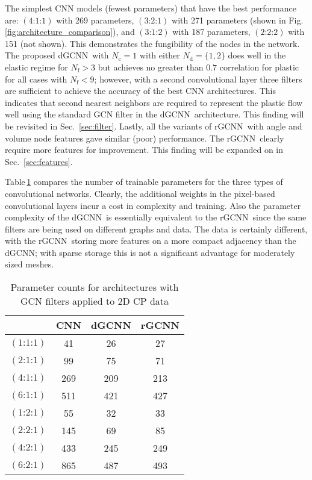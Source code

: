 \documentclass[12pt,reqno]{article}
\newcommand{\fref}[1]{Fig.\,\ref{#1}}
\newcommand{\tref}[1]{Table\,\ref{#1}}
\newcommand{\sref}[1]{Sec.\!~\ref{#1}}
\newcommand{\DGCNN}{{dGCNN}}
\newcommand{\RGCNN}{{rGCNN}}
\newcommand{\arch}[3]{({#1}\text{:}{#2}\text{:}{#3})}
\newcommand{\Nf}{N_\text{f}}
\newcommand{\Nc}{N_\text{c}}
\newcommand{\Nd}{N_\text{d}}
\begin{document}
The simplest CNN models (fewest parameters) that have the best performance are: $\arch{4}{1}{1}$ with 269 parameters, $\arch{3}{2}{1}$ with 271 parameters  (shown in \fref{fig:architecture_comparison}), and $\arch{3}{1}{2}$ with 187 parameters, $\arch{2}{2}{2}$ with 151  (not shown).
This demonstrates the fungibility of the nodes in the network.
The proposed \DGCNN~with $\Nc=1$ with either $\Nd=\{1,2\}$ does well in the elastic regime for $\Nf > 3$ but achieves no greater than $0.7$ correlation for plastic for all cases with $\Nf < 9$; however, with a second convolutional layer three filters are sufficient to achieve the accuracy of the best CNN architectures.
This indicates that second nearest neighbors are required to represent the plastic flow well using the standard GCN filter in the \DGCNN~architecture.
This finding will be revisited in \sref{sec:filter}.
Lastly, all the variants of \RGCNN~with angle and volume node features gave similar (poor) performance.
The \RGCNN~clearly require more features for improvement.
This finding will be expanded on in \sref{sec:features}.

\tref{tab:parameter_counts} compares the number of trainable parameters for the three types of convolutional networks.
Clearly, the additional weights in the pixel-based convolutional layers incur a cost in complexity and training.
Also the parameter complexity of the \DGCNN~is essentially equivalent to the \RGCNN~since the same filters are being used on different graphs and data.
The data is certainly different, with the \RGCNN~storing more features on a more compact adjacency than the \DGCNN; with sparse storage this is not a significant advantage for moderately sized meshes.

\begin{table}
\centering
\begin{tabular}{|c|c|c|c|}
\hline
& CNN & \DGCNN & \RGCNN \\
\hline
$\arch{1}{1}{1}$ & 41 & 26 & 27 \\
$\arch{2}{1}{1}$ & 99 & 75 & 71 \\
$\arch{4}{1}{1}$ & 269 & 209 & 213 \\
$\arch{6}{1}{1}$ & 511 & 421 & 427 \\
\hline
$\arch{1}{2}{1}$ & 55 & 32 & 33 \\
$\arch{2}{2}{1}$ & 145 & 69 & 85 \\
$\arch{4}{2}{1}$ & 433 & 245 & 249 \\
$\arch{6}{2}{1}$ & 865 & 487 & 493 \\
\hline
\end{tabular}
\caption{Parameter counts for architectures with GCN filters applied to 2D CP data}
\label{tab:parameter_counts}
\end{table}
\end{document}
